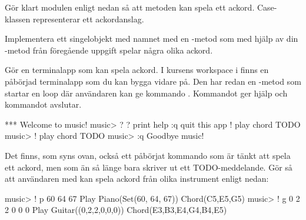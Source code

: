 {\Task Gör klart modulen  enligt nedan så att metoden  kan spela ett ackord. Case-klassen  representerar ett ackordanslag.


\Task Implementera ett singelobjekt med namnet  med en -metod som med hjälp av din -metod från föregående uppgift spelar några olika ackord.





\Task Gör en terminalapp som kan spela ackord. I kursens workspace i  finns en påbörjad terminalapp som du kan bygga vidare på. Den har redan en -metod som startar en loop där användaren kan ge kommando . Kommandot  ger hjälp och kommandot  avslutar.

\begin{REPL}
*** Welcome to music!
music> ?
?         print help
:q        quit this app
!         play chord TODO
music> !
play chord TODO
music> :q
Goodbye music!
\end{REPL}

Det finns, som syns ovan, också ett påbörjat kommando \code{!} som är tänkt att spela ett ackord, men som än så länge bara skriver ut ett TODO-meddelande. Gör så att användaren med \code{!} kan spela ackord från olika instrument enligt nedan:

\begin{REPL}
music> ! p 60 64 67
Play Piano(Set(60, 64, 67)) Chord(C5,E5,G5)
music> ! g 0 2 2 0 0 0
Play Guitar((0,2,2,0,0,0)) Chord(E3,B3,E4,G4,B4,E5)
\end{REPL}

}
